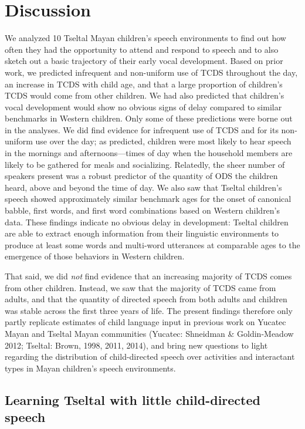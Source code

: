 \documentclass[,man,floatsintext]{apa6}
\begin{document}
\hypertarget{disc}{\section{Discussion}\label{disc}}

We analyzed 10 Tseltal Mayan children's speech environments to find out
how often they had the opportunity to attend and respond to speech and
to also sketch out a basic trajectory of their early vocal development.
Based on prior work, we predicted infrequent and non-uniform use of TCDS
throughout the day, an increase in TCDS with child age, and that a large
proportion of children's TCDS would come from other children. We had
also predicted that children's vocal development would show no obvious
signs of delay compared to similar benchmarks in Western children. Only
some of these predictions were borne out in the analyses. We did find
evidence for infrequent use of TCDS and for its non-uniform use over the
day; as predicted, children were most likely to hear speech in the
mornings and afternoons---times of day when the household members are
likely to be gathered for meals and socializing. Relatedly, the sheer
number of speakers present was a robust predictor of the quantity of ODS
the children heard, above and beyond the time of day. We also saw that
Tseltal children's speech showed approximately similar benchmark ages
for the onset of canonical babble, first words, and first word
combinations based on Western children's data. These findings indicate
no obvious delay in development: Tseltal children are able to extract
enough information from their linguistic environments to produce at
least some words and multi-word utterances at comparable ages to the
emergence of those behaviors in Western children.

That said, we did \emph{not} find evidence that an increasing majority
of TCDS comes from other children. Instead, we saw that the majority of
TCDS came from adults, and that the quantity of directed speech from
both adults and children was stable across the first three years of
life. The present findings therefore only partly replicate estimates of
child language input in previous work on Yucatec Mayan and Tseltal Mayan
communities (Yucatec: Shneidman \& Goldin-Meadow 2012; Tseltal: Brown,
1998, 2011, 2014), and bring new questions to light regarding the
distribution of child-directed speech over activities and interactant
types in Mayan children's speech environments.

\subsection{Learning Tseltal with little child-directed
speech}\label{learning-tseltal-with-little-child-directed-speech}
\end{document}
